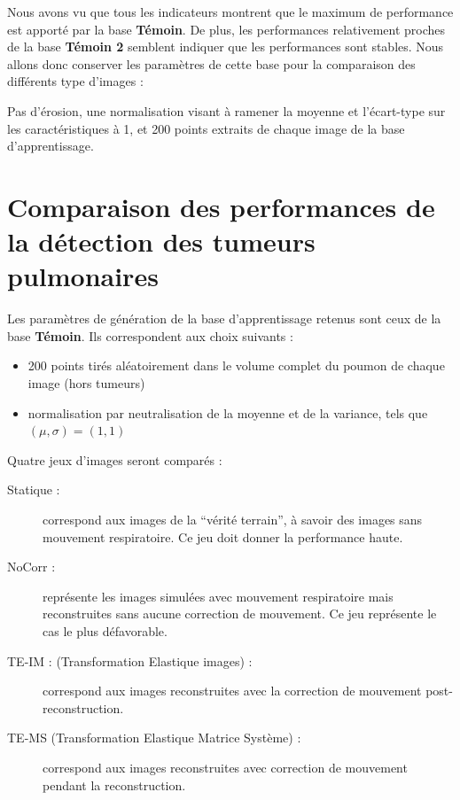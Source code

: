 Nous avons vu que tous les indicateurs montrent que le maximum de performance est apporté par la base \textbf{Témoin}. De plus, les  performances relativement proches de la base \textbf{Témoin 2} semblent indiquer que les performances sont stables. Nous allons donc conserver les paramètres de cette base pour la comparaison des différents type d'images :

Pas d'érosion, une normalisation visant à ramener la moyenne et l'écart-type sur les caractéristiques à 1, et 200 points extraits de chaque image de la base d'apprentissage.
 

\FloatBarrier

\section{Comparaison des performances de la détection des tumeurs pulmonaires}

Les paramètres de génération de la base d'apprentissage retenus sont ceux de la base \textbf{Témoin}. Ils correspondent aux choix suivants :

\begin{itemize}
 \item 200 points tirés aléatoirement dans le volume complet du poumon de chaque image (hors tumeurs)
 \item normalisation par neutralisation de la moyenne et de la variance, tels que $(\mu, \sigma) = (1,1)$
\end{itemize}


Quatre jeux d'images seront comparés :

\begin{description}
 \item[Statique :] correspond aux images de la ``vérité terrain'', à savoir des images sans mouvement respiratoire. Ce jeu doit donner la performance haute.  
\item[NoCorr :] représente les images simulées avec mouvement respiratoire mais reconstruites sans aucune correction de mouvement. Ce jeu représente le cas le plus défavorable. 
 \item [TE-IM : (Transformation Elastique images) :] correspond aux images reconstruites avec la correction de mouvement post-reconstruction.
 \item [TE-MS (Transformation Elastique Matrice Système) :] correspond aux images reconstruites avec correction de mouvement pendant la reconstruction.
\end{description}



